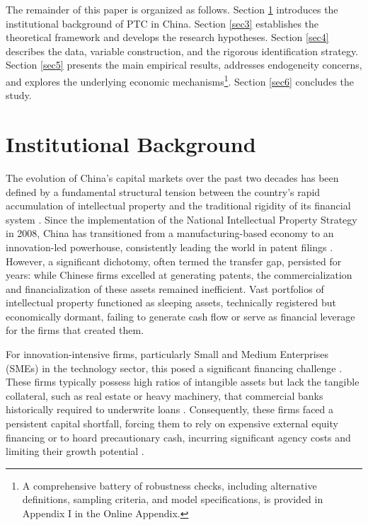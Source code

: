 \documentclass[12pt,a4paper]{article}
\begin{document}
The remainder of this paper is organized as follows. Section \ref{sec2} introduces the institutional background of PTC in China. Section \ref{sec3} establishes the theoretical framework and develops the research hypotheses. Section \ref{sec4} describes the data, variable construction, and the rigorous identification strategy. Section \ref{sec5} presents the main empirical results, addresses endogeneity concerns, and explores the underlying economic mechanisms\footnote{A comprehensive battery of robustness checks, including alternative definitions, sampling criteria, and model specifications, is provided in Appendix I in the Online Appendix.}. Section \ref{sec6} concludes the study.

\section{Institutional Background}\label{sec2}
The evolution of China’s capital markets over the past two decades has been defined by a fundamental structural tension between the country's rapid accumulation of intellectual property and the traditional rigidity of its financial system \citep{chen2024does,yu2025impact}. Since the implementation of the National Intellectual Property Strategy in 2008, China has transitioned from a manufacturing-based economy to an innovation-led powerhouse, consistently leading the world in patent filings \citep{han2025does}. However, a significant dichotomy, often termed the transfer gap, persisted for years: while Chinese firms excelled at generating patents, the commercialization and financialization of these assets remained inefficient. Vast portfolios of intellectual property functioned as sleeping assets, technically registered but economically dormant, failing to generate cash flow or serve as financial leverage for the firms that created them.

For innovation-intensive firms, particularly Small and Medium Enterprises (SMEs) in the technology sector, this posed a significant financing challenge \citep{lee2015access}. These firms typically possess high ratios of intangible assets but lack the tangible collateral, such as real estate or heavy machinery, that commercial banks historically required to underwrite loans \citep{hochberg2018patent}. Consequently, these firms faced a persistent capital shortfall, forcing them to rely on expensive external equity financing or to hoard precautionary cash, incurring significant agency costs and limiting their growth potential \citep{fazzari1988financing,almeida2001financial,couzoff2022effectiveness,zhao2024agency}.
\end{document}
